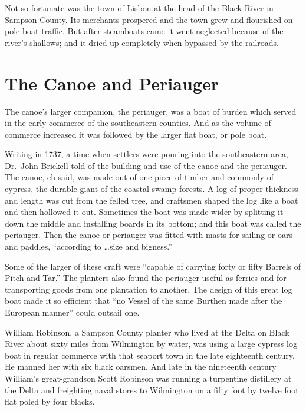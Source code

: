 \documentclass[11pt, a5paper]{book}
\begin{document}
Not so fortunate was the town of Lisbon at the head of the Black River
in Sampson County.  Its merchants prospered and the town grew and
flourished on pole boat traffic.  But after steamboats came it went
neglected because of the river's shallows; and it dried up completely
when bypassed by the railroads.\par

\section*{The Canoe and Periauger}

The canoe's larger companion, the periauger, was a boat of burden
which served in the early commerce of the southeastern counties.  And
as the volume of commerce increased it was followed by the larger flat
boat, or pole boat.\par

Writing in 1737, a time when settlers were pouring into the
southeastern area, Dr.\ John Brickell told of the building and use of
the canoe and the periauger.  The canoe, eh said, was made out of one
piece of timber and commonly of cypress, the durable giant of the
coastal swamp forests.  A log of proper thickness and length was cut
from the felled tree, and craftsmen shaped the log like a boat and
then hollowed it out.  Sometimes the boat was made wider by splitting
it down the middle and installing boards in its bottom; and this boat
was called the periauger.  Then the canoe or periauger was fitted with
masts for sailing or oars and paddles, ``according to \ldots size and
bigness.''\par

Some of the larger of these craft were ``capable of carrying forty or
fifty Barrels of Pitch and Tar.''  The planters also found the
periauger useful as ferries and for transporting goods from one
plantation to another.  The design of this great log boat made it so
efficient that ``no Vessel of the same Burthen made after the European
manner'' could outsail one.\citep[260-261]{brickellj}\par

William Robinson, a Sampson County planter who lived at the Delta on
Black River about sixty miles from Wilmington by water, was using a
large cypress log boat in regular commerce with that seaport town in
the late eighteenth century.  He manned her with six black oarsmen.
And late in the nineteenth century William's great-grandson Scott
Robinson was running a turpentine distillery at the Delta and
freighting naval stores to Wilmington on a fifty foot by twelve foot
flat poled by four blacks.  \citep{shawg}\par
\end{document}
